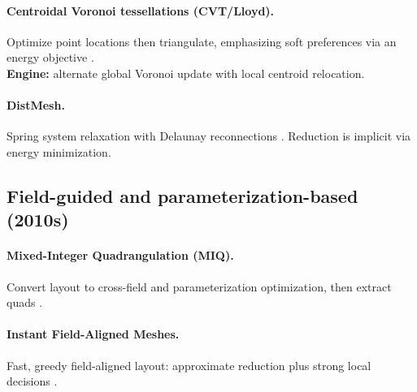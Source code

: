 \paragraph{Centroidal Voronoi tessellations (CVT/Lloyd).} Optimize point locations then triangulate, emphasizing soft preferences via an energy objective \citep{du1999centroidal,lloyd1982least}.
\\\textbf{Engine:} alternate global Voronoi update with local centroid relocation.

\paragraph{DistMesh.} Spring system relaxation with Delaunay reconnections \citep{persson2004simple}. Reduction is implicit via energy minimization.

\subsection{Field-guided and parameterization-based (2010s)}
\paragraph{Mixed-Integer Quadrangulation (MIQ).} Convert layout to cross-field and parameterization optimization, then extract quads \citep{bommes2009mixed}.

\paragraph{Instant Field-Aligned Meshes.} Fast, greedy field-aligned layout: approximate reduction plus strong local decisions \citep{jakob2015instant}.
